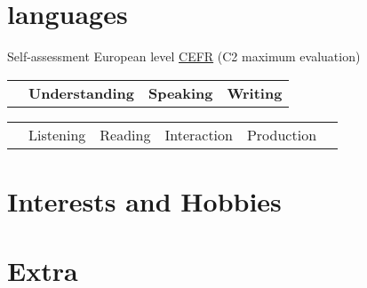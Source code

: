 \documentclass[11pt,a4paper]{moderncv}
\begin{document}

\section{languages}

\hspace{25mm}\small Self-assessment European level \href{http://europass.cedefop.europa.eu/en/resources/european-language-levels-cefr}{CEFR} (C2 maximum evaluation)\normalsize
\vspace{5mm}

\begin{tabular}{p{67mm} p{40mm} p{40mm} p{20mm}}
& \textbf{Understanding} & \textbf{Speaking} & \textbf{Writing} \\
\end{tabular}

\begin{tabular}{p{67mm} p{20mm} p{20mm} p{20mm} p{20mm} p{20mm}}
& Listening & Reading & Interaction & Production & \\
\end{tabular}

\vspace{3mm}

\section{Interests and Hobbies}

\section{Extra}
\small
{}

\closesection{}                   %
\renewcommand{\listitemsymbol}{-} %

%
\end{document}
